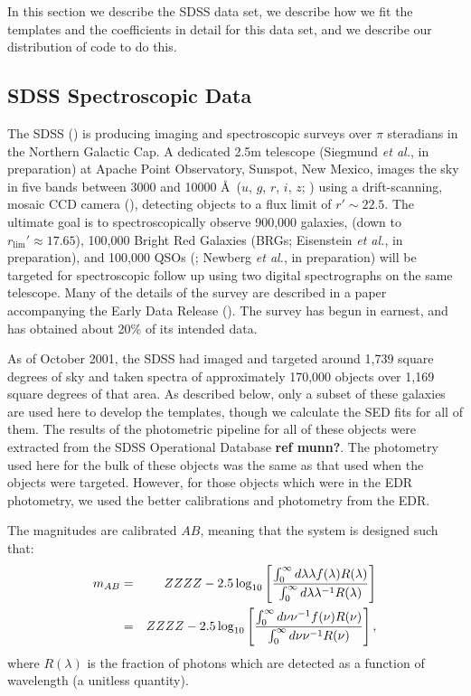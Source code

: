 \documentclass[10pt,preprint]{aastex}
\begin{document}
In this section we describe the SDSS data set, we describe how we fit
the templates and the coefficients in detail for this data set, and we
describe our distribution of code to do this.

\subsection{SDSS Spectroscopic Data}

The SDSS (\citealt{york00a}) is producing imaging and spectroscopic
surveys over $\pi$ steradians in the Northern Galactic Cap. A
dedicated 2.5m telescope (Siegmund {\it et al.}, in preparation) at
Apache Point Observatory, Sunspot, New Mexico, images the sky in five
bands between 3000 and 10000 \AA\ ($u$, $g$, $r$, $i$, $z$;
\citealt{fukugita96a}) using a drift-scanning, mosaic CCD camera
(\citealt{gunn98a}), detecting objects to a flux limit of $r'\sim
22.5$. The ultimate goal is to spectroscopically observe 900,000
galaxies, (down to $r_{\mathrm{lim}}'\approx 17.65$), 100,000 Bright
Red Galaxies (BRGs; Eisenstein {\it et al.}, in preparation), and
100,000 QSOs (\citealt{fan99a}; Newberg {\it et al.}, in preparation)
will be targeted for spectroscopic follow up using two digital
spectrographs on the same telescope. Many of the details of the survey
are described in a paper accompanying the Early Data Release
(\citealt{stoughton01a}). The survey has begun in earnest, and has
obtained about 20\% of its intended data.

As of October 2001, the SDSS had imaged and targeted around 1,739
square degrees of sky and taken spectra of approximately 170,000
objects over 1,169 square degrees of that area. As described below,
only a subset of these galaxies are used here to develop the
templates, though we calculate the SED fits for all of them. The
results of the photometric pipeline for all of these objects were
extracted from the SDSS Operational Database {\bf ref munn?}. The
photometry used here for the bulk of these objects was the same as
that used when the objects were targeted.  However, for those objects
which were in the EDR photometry, we used the better calibrations and
photometry from the EDR.

The magnitudes are calibrated $AB$, meaning that the system is
designed such that:
\begin{eqnarray}
m_{AB} &=& ZZZZ - 2.5 \log_{10}\left[
\frac{\int_{0}^{\infty} d\lambda \lambda f(\lambda) R(\lambda)}
{\int_{0}^{\infty} d\lambda \lambda^{-1} R(\lambda)}\right]
\cr
&=& ZZZZ - 2.5 \log_{10}\left[
\frac{\int_{0}^{\infty} d\nu \nu^{-1} f(\nu) R(\nu)}
{\int_{0}^{\infty} d\nu \nu^{-1} R(\nu)}\right],
\cr
\end{eqnarray}
where $R(\lambda)$ is the fraction of photons which are detected as a
function of wavelength (a unitless quantity). 
\end{document}
